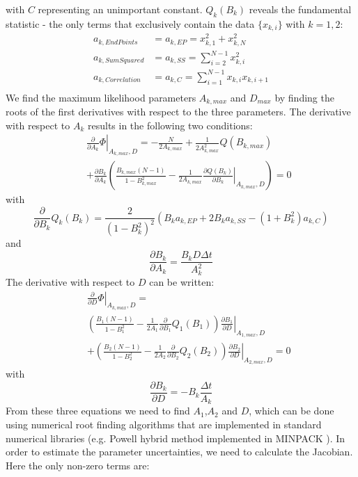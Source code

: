 \documentclass[%
 reprint,
 amsmath,amssymb,
 aps,
]{revtex4-1}
\begin{document}
with $C$ representing an unimportant constant. $Q_{k}(B_{k})$ reveals the fundamental statistic - the only terms that exclusively contain the data $\{x_{k,i}\}$ with $k=1,2$:
\begin{equation}
	\begin{aligned}
		a_{k,EndPoints}&=a_{k,EP}=x_{k,1}^{2}+x_{k,N}^{2}\\
		a_{k,SumSquared}&=a_{k,SS}=\sum\limits_{i=2}^{N-1}x_{k,i}^{2}\\
		a_{k,Correlation}&=a_{k,C}=\sum\limits_{i=1}^{N-1}x_{k,i}x_{k,i+1}\\
	\end{aligned}
\end{equation}
We find the maximum likelihood parameters $A_{k,max}$ and $D_{max}$ by finding the roots of the first derivatives with respect to the three parameters.  The derivative with respect to $A_{k}$ results in the following two conditions:
\begin{eqnarray}\label{partialsigma}
	&&\left.\frac{\partial}{\partial A_{k}}\Phi\right|_{A_{k,max},D} = -\frac{N}{2A_{k,max}}
	+\frac{1}{2A_{k,max}^{2}}Q(B_{k,max})\\
	&&+\frac{\partial B_{k}}{\partial A_{k}}\left(\frac{B_{k,max}(N-1)}{1-B_{k,max}^2}
	 -\frac{1}{2A_{k,max}}
	 \left.\frac{\partial Q(B_{k})}{\partial B_{k}}
	 \right|_{A_{k,max},D}\right)=0
\end{eqnarray}
with
\begin{equation}
	\frac{\partial}{\partial B_{k}}Q_{k}(B_{k}) =  \frac{2}{(1-B_{k}^{2})^{2}}\left(B_{k}a_{k,EP}+2B_{k}a_{k,SS}-(1+B_{k}^{2})a_{k,C}\right)
\end{equation}
and
\begin{equation}
	\frac{\partial B_{k}}{\partial A_{k}} = \frac{B_{k}D\Delta t}{A_{k}^{2}}
\end{equation}
The derivative with respect to $D$ can be written:
\begin{eqnarray}\label{partiald}
	&&\left.\frac{\partial}{\partial D}\Phi\right|_{A_{k,max},D} =\\
	&&\left(\frac{B_{1}(N-1)}{1-B_{1}^{2}}
	-\frac{1}{2A_{1}}\frac{\partial}{\partial B_{1}}Q_{1}(B_{1})\right)\left.\frac{\partial B_{1}}{\partial D}\right|_{A_{1,max},D}\\
	&&+\left(\frac{B_{2}(N-1)}{1-B_{2}^{2}}
	-\frac{1}{2A_{2}}\frac{\partial}{\partial B_{2}}Q_{2}(B_{2})\right)\left.\frac{\partial B_{2}}{\partial D}\right|_{A_{2,max},D}=0
\end{eqnarray}
with
\begin{equation}
	\frac{\partial B_{k}}{\partial D} = -B_{k}\frac{\Delta t}{A_{k}}
\end{equation}
From these three equations we need to find $A_{1}$,$A_{2}$ and $D$, which can be done using numerical root finding algorithms that are implemented in standard numerical libraries (e.g. Powell hybrid method implemented in MINPACK \cite{osti_6997568}).  In order to estimate the parameter uncertainties, we need to calculate the Jacobian.  Here the only non-zero terms are:
\end{document}
